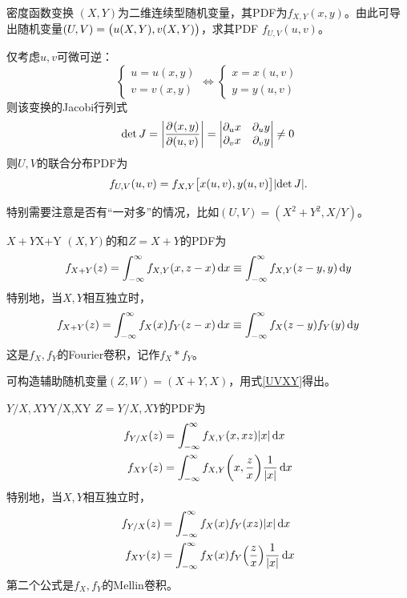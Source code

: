\begin{theorem}
	{密度函数变换}{}
	$(X,Y)$为二维连续型随机变量，其PDF为$f_{X,Y}(x,y)$。由此可导出随机变量$(U,V) = \bigl(u(X,Y),v(X,Y)\bigr)$，求其PDF $f_{U,V}(u,v)$。
	
	仅考虑$u,v$可微可逆：
	\[
		\begin{cases}
			u = u(x,y)\\
			v = v(x,y)
		\end{cases} \iff
		\begin{cases}
			x = x(u,v)\\
			y = y(u,v)
		\end{cases}
	\]
	则该变换的Jacobi行列式
	\begin{equation}\label{eq:ps-change-of-variables-jacobian}
		\det J = \biggl\lvert\frac{\partial^{}(x,y)}{\partial{(u,v)}^{}}\biggr\rvert = \begin{vmatrix}
			\partial_u x&\partial_u y\\\partial_v x&\partial_v y
		\end{vmatrix} \neq 0
	\end{equation}
	则$U,V$的联合分布PDF为
	\begin{equation}
		\label{UVXY}
		f_{U,V}(u,v) = f_{X,Y}\bigl[x(u,v),y(u,v)\bigr]\lvert\det J\rvert.
	\end{equation}
\end{theorem}
\begin{remark}
	特别需要注意是否有“一对多”的情况，比如$(U,V) = (X^2 + Y^2,X/Y)$。
\end{remark}
\begin{example}{$X + Y$}{X+Y}
	$(X,Y)$的和$Z = X + Y$的PDF为
	\begin{equation}
		f_{X+Y}(z) = \int_{-\infty}^\infty f_{X,Y}(x,z - x)\mathop{}\!\mathrm{d} x \equiv \int_{-\infty}^\infty f_{X,Y}(z - y,y)\mathop{}\!\mathrm{d} y
	\end{equation}
	特别地，当$X,Y$相互独立时，%
	\begin{equation}\label{eq:ps-convolution}
		f_{X+Y}(z) = \int_{-\infty}^\infty f_X(x)f_Y(z - x)\mathop{}\!\mathrm{d} x \equiv \int_{-\infty}^\infty f_X(z - y)f_Y(y)\mathop{}\!\mathrm{d} y
	\end{equation}
	这是$f_X,f_Y$的Fourier卷积，记作$f_X \ast f_Y$。
\end{example}
\begin{remark}
	可构造辅助随机变量$(Z,W) = (X + Y,X)$，用式\eqref{UVXY}得出。
\end{remark}
\begin{example}{$Y/X,XY$}{Y/X,XY}
	$Z = Y/X,XY$的PDF为
	\begin{subequations}
		\begin{align}
			f_{Y/X}(z) &= \int_{-\infty}^\infty f_{X,Y}(x,xz)\lvert x\rvert\mathop{}\!\mathrm{d} x\\
			f_{XY}(z) &= \int_{-\infty}^\infty f_{X,Y}\biggl(x,\frac zx\biggr)\frac1{\lvert x\rvert}\mathop{}\!\mathrm{d} x
		\end{align}
	\end{subequations}
	特别地，当$X,Y$相互独立时，
	\begin{subequations}
		\begin{align}
			f_{Y/X}(z) &= \int_{-\infty}^\infty f_X(x)f_Y(xz)\lvert x\rvert\mathop{}\!\mathrm{d} x\\
			f_{XY}(z) &= \int_{-\infty}^\infty f_X(x)f_Y\Bigl(\frac zx\Bigr)\frac1{\lvert x\rvert}\mathop{}\!\mathrm{d} x
		\end{align}
	\end{subequations}
	第二个公式是$f_X,f_Y$的Mellin卷积。
\end{example}
